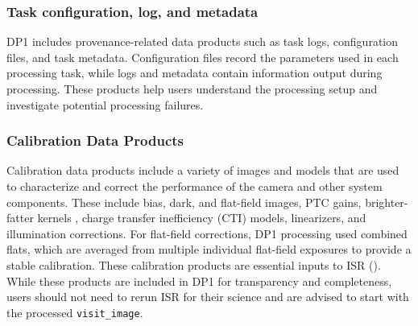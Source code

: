 \subsubsection{Task configuration, log, and metadata}
\gls{DP1} includes \gls{provenance}-related data products such as task logs, \gls{configuration} files, and task metadata.
Configuration files record the parameters used in each processing task, while logs and \gls{metadata} contain information output during processing. These products help users understand the processing setup and investigate potential processing failures.

\subsubsection{Calibration Data Products}
\label{ssec:calibration_data}
Calibration data products include a variety of images and models that are used to characterize and correct the performance of the camera and other system components.
These include bias, dark, and flat-field images, \gls{PTC} gains, brighter-fatter kernels \citep{2014JInst...9C3048A}, charge transfer inefficiency (\gls{CTI}) models, linearizers, and illumination corrections.
For flat-field corrections, \gls{DP1} processing used combined flats, which are averaged from multiple individual flat-field exposures to provide a stable \gls{calibration}. These \gls{calibration} products are essential inputs to \gls{ISR} (). While these products are included in \gls{DP1} for transparency and completeness, users should not need to rerun ISR for their science and are advised to start with the processed \texttt{visit\_image}.
